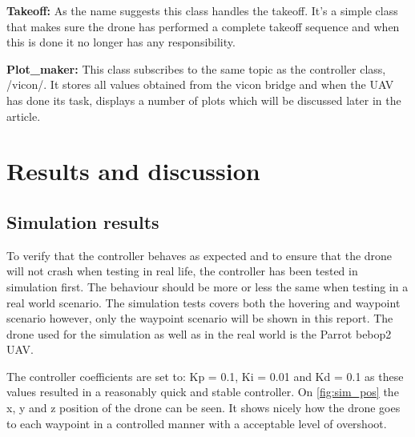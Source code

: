 \documentclass[conference]{IEEEtran}
\begin{document}
\textbf{Takeoff:} As the name suggests this class handles the takeoff. It's a simple class that makes sure the drone has performed a complete takeoff sequence and when this is done it no longer has any responsibility. 

\textbf{Plot\_maker:} This class subscribes to the same topic as the controller class, /vicon/. It stores all values obtained from the vicon bridge and when the UAV has done its task, displays a number of plots which will be discussed later in the article. 


\section{Results and discussion}


\subsection{Simulation results}
To verify that the controller behaves as expected and to ensure that the drone will not crash when testing in real life, the controller has been tested in simulation first. The behaviour should be more or less the same when testing in a real world scenario. The simulation tests covers both the hovering and waypoint scenario however, only the waypoint scenario will be shown in this report. The drone used for the simulation as well as in the real world is the Parrot bebop2 UAV.

The controller coefficients are set to: Kp = 0.1, Ki = 0.01 and Kd = 0.1 as these values resulted in a reasonably quick and stable controller. On \cref{fig:sim_pos} the x, y and z position of the drone can be seen. It shows nicely how the drone goes to each waypoint in a controlled manner with a acceptable level of overshoot.  
\end{document}
